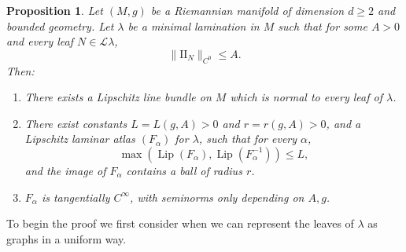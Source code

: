 \documentclass[final,12pt, leqno]{brownthesis}
\DeclareMathOperator{\Lip}{Lip}
\newcommand{\Two}{\mathrm{I\!I}}
\newcommand{\Leaves}{\mathcal L}
\newtheorem{proposition}[theorem]{Proposition}
\theoremstyle{definition}
\numberwithin{equation}{section}
\begin{document}
\begin{proposition}\label{regularity theorem}
Let $(M, g)$ be a Riemannian manifold of dimension $d \geq 2$ and bounded geometry.
Let $\lambda$ be a minimal lamination in $M$ such that for some $A > 0$ and every leaf $N \in \Leaves \lambda$,
\begin{equation}\label{curvature bound in regularity}
	\|\Two_N\|_{C^0} \leq A.
\end{equation}
Then:
\begin{enumerate}
\item There exists a Lipschitz line bundle on $M$ which is normal to every leaf of $\lambda$.
\item There exist constants $L = L(g, A) > 0$ and $r = r(g, A) > 0$, and a Lipschitz laminar atlas $(F_\alpha)$ for $\lambda$, such that for every $\alpha$,
\begin{equation}\label{conorm of flow box}
	\max(\Lip(F_\alpha), \Lip(F_\alpha^{-1})) \leq L,
\end{equation}
and the image of $F_\alpha$ contains a ball of radius $r$.
\item $F_\alpha$ is tangentially $C^\infty$, with seminorms only depending on $A, g$.
\end{enumerate}
\end{proposition}

To begin the proof we first consider when we can represent the leaves of $\lambda$ as graphs in a uniform way.
\end{document}
